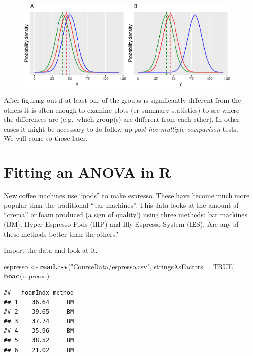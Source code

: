 \documentclass[
  a4paperpaper,
]{book}
\newenvironment{Shaded}{\begin{snugshade}}{\end{snugshade}}
\newcommand{\DataTypeTok}[1]{\textcolor[rgb]{0.13,0.29,0.53}{#1}}
\newcommand{\KeywordTok}[1]{\textcolor[rgb]{0.13,0.29,0.53}{\textbf{#1}}}
\newcommand{\NormalTok}[1]{#1}
\newcommand{\OtherTok}[1]{\textcolor[rgb]{0.56,0.35,0.01}{#1}}
\newcommand{\StringTok}[1]{\textcolor[rgb]{0.31,0.60,0.02}{#1}}
\begin{document}
\begin{figure}[ht]

\includegraphics{BB852_files/figure-latex/anova_vis-1} \hfill{}

\end{figure}

After figuring out if at least one of the groups is significantly different from the others it is often enough to examine plots (or summary statistics) to see where the differences are (e.g.~which group(s) are different from each other). In other cases it might be necessary to do follow up \emph{post-hoc multiple comparison} tests. We will come to those later.

\hypertarget{fitting-an-anova-in-r}{%
\section{Fitting an ANOVA in R}\label{fitting-an-anova-in-r}}

New coffee machines use ``pods'' to make espresso. These have become much more popular than the traditional ``bar machines''. This data looks at the amount of ``crema'' or foam produced (a sign of quality!) using three methods: bar machines (BM), Hyper Espresso Pods (HIP) and Illy Espresso System (IES). Are any of these methods better than the others?

Import the data and look at it.

\begin{Shaded}
\begin{Highlighting}[]
\NormalTok{espresso \textless{}{-}}\StringTok{ }\KeywordTok{read.csv}\NormalTok{(}\StringTok{"CourseData/espresso.csv"}\NormalTok{, }\DataTypeTok{stringsAsFactors =} \OtherTok{TRUE}\NormalTok{)}
\KeywordTok{head}\NormalTok{(espresso)}
\end{Highlighting}
\end{Shaded}

\begin{verbatim}
##   foamIndx method
## 1    36.64     BM
## 2    39.65     BM
## 3    37.74     BM
## 4    35.96     BM
## 5    38.52     BM
## 6    21.02     BM
\end{verbatim}
\end{document}
